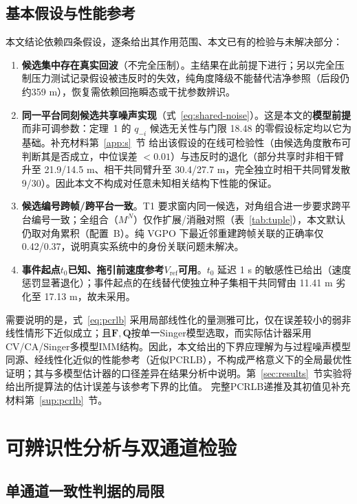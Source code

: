 \documentclass[UTF8,a4paper,zihao=-4]{ctexart}
\begin{document}
\subsection{基本假设与性能参考}\label{sec:reference-bound}
本文结论依赖四条假设，逐条给出其作用范围、本文已有的检验与未解决部分：
\begin{enumerate}
\item \textbf{候选集中存在真实回波}（不完全压制）。主结果在此前提下进行；另以完全压制压力测试记录假设被违反时的失效，纯角度降级不能替代洁净参照（后段仍约359 m），恢复需依赖回拖瞬态或干扰参数辨识。
\item \textbf{同一平台同刻候选共享噪声实现}（式~\eqref{eq:shared-noise}）。这是本文的\textbf{模型前提}而非可调参数：定理~1 的 \(q_{-i}\) 候选无关性与门限 18.48 的零假设标定均以它为基础。补充材料第~\ref{app:s}~节 给出该假设的在线可检验性（由候选角度散布可判断其是否成立，中位误差 $<0.01$）与违反时的退化（部分共享时非相干臂升至 21.9/14.5 m、相干共同臂升至 30.4/27.7 m，完全独立时相干共同臂发散 9/30）。因此本文不构成对任意未知相关结构下性能的保证。
\item \textbf{候选编号跨帧/跨平台一致}。T1 要求窗内同一候选，对角组合进一步要求跨平台编号一致；全组合（\(M^N\)）仅作扩展/消融对照（表~\ref{tab:tuple}），本文默认仍取对角累积（配置~B）。纯 VGPO 下最近邻重建跨帧关联的正确率仅 0.42/0.37，说明真实系统中的身份关联问题未解决。
\item \textbf{事件起点\(t_0\)已知、拖引前速度参考\(V_{\mathrm{ref}}\)可用}。\(t_0\) 延迟 1 s 的敏感性已给出（速度惩罚显著退化）；事件起点的在线替代使独立种子集相干共同臂由 11.41 m 劣化至 17.13 m，故未采用。
\end{enumerate}

需要说明的是，式~\eqref{eq:pcrlb} 采用局部线性化的量测雅可比，仅在误差较小的弱非线性情形下近似成立；且\(\mathbf{F},\mathbf{Q}\)按单一Singer模型选取，而实际估计器采用CV/CA/Singer多模型IMM结构。因此，本文给出的下界应理解为与过程噪声模型同源、经线性化近似的性能参考（近似PCRLB），不构成严格意义下的全局最优性证明；其与多模型估计器的口径差异在结果分析中说明。第~\ref{sec:results}~节实验将给出所提算法的估计误差与该参考下界的比值。
完整PCRLB递推及其初值见补充材料第~\ref{sup:pcrlb}~节。



\section{可辨识性分析与双通道检验}\label{sec:theory}


\subsection{单通道一致性判据的局限}\label{sec:single-channel}
\end{document}
